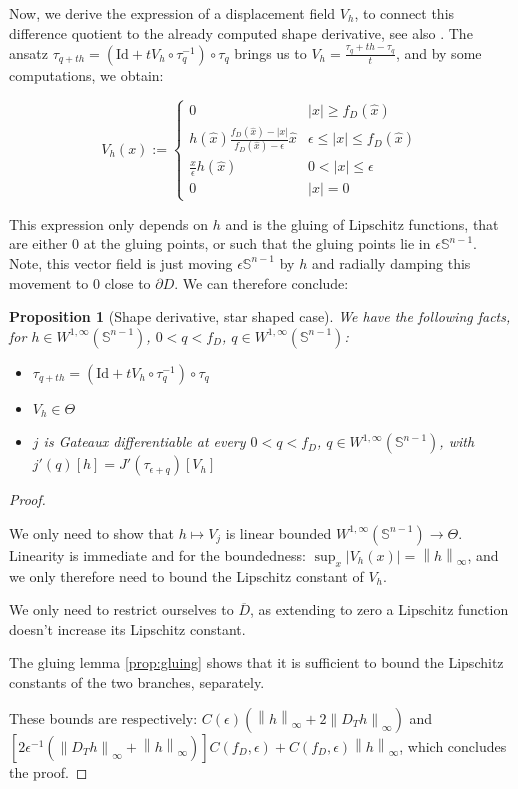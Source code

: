 \documentclass[english,a4paper,9pt,oneside]{scrbook}	%
\theoremstyle{break}
\newtheorem{prop}[equation]{Proposition}
\newenvironment{mproof}[1][\proofname]{%
  \begin{proof}[#1]$ $\par\nobreak\ignorespaces
}{%
  \end{proof}
}
\renewcommand*{\proofname}{Proof}
\theoremstyle{remark}
\newcommand{\mS}{\mathbb{S}^{n-1}}
\newcommand{\ds}{\displaystyle}
\newcommand{\norm}[1]{\left\lVert#1\right\rVert}
\newcommand{\id}{\text{Id}}
\newcommand{\Te}{\Theta}
\newcommand{\xh}{\hat{x}}
\newcommand{\eps}{\epsilon}
\begin{document}
Now, we derive the expression of a displacement field $V_h$, to connect this difference quotient to the already computed shape derivative, see also \cite{deckelnick}. The ansatz $\tau_{q+th}=(\id + tV_h\circ \tau_q^{-1})\circ \tau_q$ brings us to $V_h = \ds \frac{\tau_q+th-\tau_q}{t}$, and by some computations, we obtain: 

$$V_h(x) :=\left\{\begin{matrix}
 0 & |x|\geq f_D(\xh)\\ 
 h(\xh)\frac{f_D(\xh)-|x|}{f_D(\xh)-\eps}\xh & \eps \leq |x| \leq f_D(\xh) \\ 
 \frac{x}{\epsilon}h(\hat{x}) & 0<|x|\leq \eps\\ 
 0 & |x|=0
\end{matrix}\right.$$

This expression only depends on $h$ and is the gluing of Lipschitz functions, that are either $0$ at the gluing points, or such that the gluing points lie in $\eps\mS$. Note, this vector field is just moving $\eps \mS$ by $h$ and radially damping this movement to $0$ close to $\partial D$. We can therefore conclude:

\begin{prop}[Shape derivative, star shaped case]
\label{prop:star_shaped_gradient}
We have the following facts, for $h \in W^{1,\infty}(\mS)$, $0<q<f_D$, $q \in W^{1,\infty}(\mS)$:

\begin{itemize}
	\item $\tau_{q+th}=(\id + tV_h\circ \tau_q^{-1})\circ \tau_q$
	\item $V_h \in \Te$
	\item $j$ is Gateaux differentiable at every $0<q<f_D$, $q \in W^{1,\infty}(\mS)$, with $j'(q)[h] = J'(\tau_{\eps+q})[V_h]$
\end{itemize}

\end{prop}
\begin{mproof}

We only need to show that $h\mapsto V_j$ is linear bounded $W^{1,\infty}(\mS)\rightarrow \Te$. Linearity is immediate and for the boundedness: $\sup_x|V_h(x)| = \norm{h}_\infty$, and we only therefore need to bound the Lipschitz constant of $V_h$. 

We only need to restrict ourselves to $\overline{D}$, as extending to zero a Lipschitz function doesn't increase its Lipschitz constant.

The gluing lemma \cref{prop:gluing} shows that it is sufficient to bound the Lipschitz constants of the two branches, separately.

These bounds are respectively: $C(\eps)(\norm{h}_\infty + 2\norm{D_T h}_\infty)$ and $[2\eps^{-1}(\norm{D_T h}_\infty + \norm{h}_\infty)]C(f_D,\eps) + C(f_D,\eps)\norm{h}_\infty$, which concludes the proof.

\end{mproof}
\end{document}
